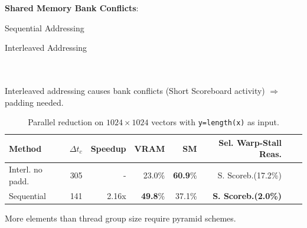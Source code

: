\documentclass{beamer}
\begin{document}
\begin{frame}
\textbf{Shared Memory Bank Conflicts}:
\\\vspace{10}
\begin{minipage}{0.94\textwidth}
\begin{minipage}{0.5\textwidth}
  \tiny
  
  Sequential Addressing
\end{minipage}
\begin{minipage}{0.5\textwidth}
  \tiny
  
  Interleaved Addressing
\end{minipage}
\end{minipage}
\\\vspace{10}
\\
Interleaved addressing causes bank conflicts (Short Scoreboard activity) $\Rightarrow$ padding needed.
\vspace{-12}
\begin{table}
    \footnotesize
  \begin{tabular}{ | l | r | r | r | r | r | r | r |}    \hline
    Method         &  $\Delta t_c$ & Speedup &VRAM              & SM              & Sel. Warp-Stall Reas.\\\hline
    Interl. no padd.    & 305                   & -       &23.0\%          & \textbf{60.9}\%  & S. Scoreb.(17.2\%)\\\hline
    Sequential     & 141                   & 2.16x   &\textbf{49.8}\%   & 37.1\%         & \textbf{S. Scoreb.(2.0\%)} \\\hline
  \end{tabular}
    \caption{\footnotesize Parallel reduction on $1024\times1024$ vectors with \texttt{y=length(x)} as input.}
\end{table}
\vspace{-10}
More elements than thread group size require pyramid schemes.
\end{frame}
\end{document}
